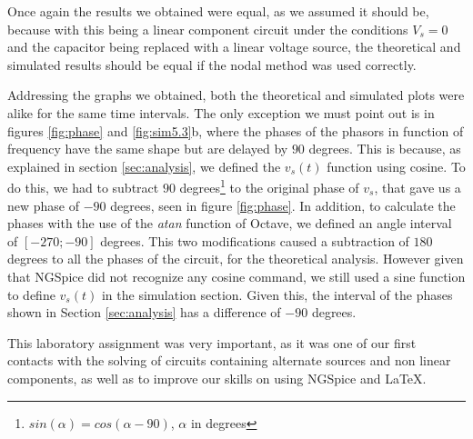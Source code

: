 Once again the results we obtained were equal, as we assumed it should be, because with this being a linear component circuit under the conditions $V_s=0$ and the capacitor being replaced with a linear voltage source, the theoretical and simulated results should be equal if the nodal method was used correctly.

Addressing the graphs we obtained, both the theoretical and simulated plots were alike for the same time intervals. The only exception we must point out is in figures \ref{fig:phase} and \ref{fig:sim5.3}b, where the phases of the phasors in function of frequency have the same shape but are delayed by $90$ degrees. This is because, as explained in section \ref{sec:analysis}, we defined the $v_s(t)$ function using cosine. To do this, we had to subtract $90$ degrees\footnote{$sin(\alpha)=cos(\alpha-90)$, $\alpha$ in degrees} to the original phase of $v_s$, that gave us a new phase of $-90$ degrees, seen in figure \ref{fig:phase}. In addition, to calculate the phases with the use of the \textit{atan} function of Octave, we defined an angle interval of $[-270; -90]$ degrees. This two modifications caused a subtraction of $180$ degrees to all the phases of the circuit, for the theoretical analysis. However given that NGSpice did not recognize any cosine command, we still used a sine function to define $v_s(t)$ in the simulation section. Given this, the interval of the phases shown in Section \ref{sec:analysis} has a difference of $-90$ degrees. \par 
This laboratory assignment was very important, as it was one of our first contacts with the solving of circuits containing alternate sources and non linear components, as well as to improve our skills on using NGSpice and LaTeX.


